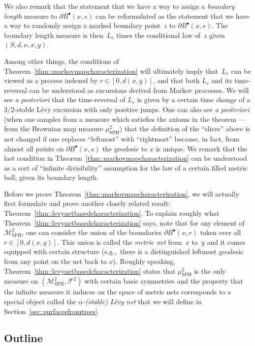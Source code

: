 \documentclass[10pt]{amsart}
\let\mathcal\mathscr
\newcommand{\sbullet}{{\scriptscriptstyle\bullet}}
\theoremstyle{plain}
\numberwithin{theorem}{section}
\theoremstyle{definition}
\newcommand\gmsspace{{\mathcal M}_{\mathrm{SPH}}}
\newcommand\mmsigma{{\mathcal F}}
\newcommand{\mustwo}{\mu_{\mathrm{SPH}}^2}
\newcommand{\fb}[2]{B^\sbullet(#1,#2)}
\begin{document}
We also remark that the statement that we have a way to assign a \emph{boundary length} measure to $\partial \fb{x}{s}$ can be reformulated as the statement that we have a way to randomly assign a marked boundary point~$z$ to $\partial \fb{x}{s}$. The boundary length measure is then~$L_s$ times the conditional law of~$z$ given $(S,d,\nu,x,y)$.\enlargethispage{\baselineskip}%

Among other things, the conditions of Theorem~\ref{thm::markovmapcharacterization} will ultimately imply that~$L_r$ can be viewed as a process indexed by $r \in [0,d(x,y)]$, and that both $L_r$ and its time-reversal can be understood as excursions derived from Markov processes. We will see \emph{a posteriori} that the time-reversal of $L_r$ is given by a certain time change of a $3/2$-stable Lévy excursion with only positive jumps. One can also see \emph{a posteriori} (when one samples from a measure which satisfies the axioms in the theorem --- \ie from the Brownian map measure $\mustwo$) that the definition of the ``slices'' above is not changed if one replaces ``leftmost'' with ``rightmost'' because, in fact, from almost all points on $\partial \fb{x}{s}$ the geodesic to $x$ is unique. We remark that the last condition in Theorem~\ref{thm::markovmapcharacterization} can be understood as a sort of ``infinite divisibility'' assumption for the law of a certain filled metric ball, given its boundary length.

Before we prove Theorem~\ref{thm::markovmapcharacterization}, we will actually first formulate and prove another closely related result: Theorem~\ref{thm::levynetbasedcharacterization}. To explain roughly what Theorem~\ref{thm::levynetbasedcharacterization} says, note that for any element of $\gmsspace^2$, one can consider the union of the boundaries $\partial \fb{x}{r}$ taken over all $r \in [0,d(x,y)]$. This union is called the \emph{metric net} from~$x$ to~$y$ and it comes equipped with certain structure (e.g.,\ there is a distinguished leftmost geodesic from any point on the net back to $x$). Roughly speaking, Theorem~\ref{thm::levynetbasedcharacterization} states that $\mustwo$ is the only measure on $(\gmsspace^2, \mmsigma^2)$ with certain basic symmetries and the property that the infinite measure it induces on the space of metric nets corresponds to a special object called the \emph{$\alpha$-(stable) Lévy net} that we will define in Section~\ref{sec::surfacesfromtrees}.

\subsection{Outline}
\label{subsec::outline}
\end{document}
